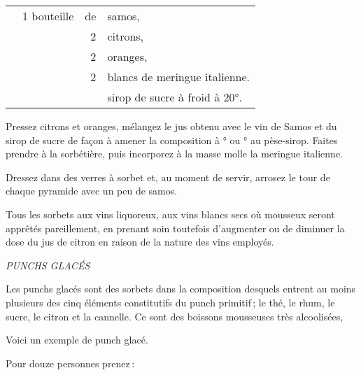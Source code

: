 \footnotesize
\begin{longtable}{rrrp{16em}}
        & 1 bouteille  & de & samos,                                                                      \\
        &              &  2 & citrons,                                                                    \\
        &              &  2 & oranges,                                                                    \\
        &              &  2 & blancs de meringue italienne.                                               \\
        &              &    & sirop de sucre à froid à 20°.                                               \\
\end{longtable}
\normalsize

Pressez citrons et oranges, mélangez le jus obtenu avec le vin de Samos et du
sirop de sucre de façon à amener la composition à {\mmm}° ou
{\mmm}° au pèse-sirop. Faites prendre à la sorbétière, puis incorporez
à la masse molle la meringue italienne.

Dressez dans des verres à sorbet et, au moment de servir, arrosez le tour de
chaque pyramide avec un peu de samos.

\sk

Tous les sorbets aux vins liquoreux, aux vins blancs secs où mousseux seront
apprêtés pareillement, en prenant soin toutefois d'augmenter ou de diminuer la
dose du jus de citron en raison de la nature des vins employés.

\bigskip

\begin{center}
\textit{PUNCHS GLACÉS}
\end{center}

\bigskip

Les punchs glacés sont des sorbets dans la composition desquels entrent au
moins plusieurs des cinq éléments constitutifs du punch primitif ; le thé, le
rhum, le sucre, le citron et la cannelle. Ce sont des boissons mousseuses très
alcoolisées,

Voici un exemple de punch glacé.

\smallskip

Pour douze personnes prenez :

